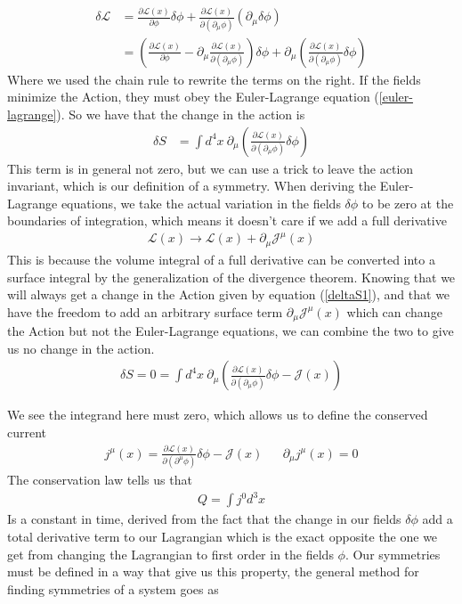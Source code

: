 \begin{align}
    \delta\mathcal{L} &= \frac{\partial\mathcal{L}(x)}{\partial\phi}\delta\phi + \frac{\partial\mathcal{L}(x)}{\partial(\partial_\mu\phi)}(\partial_\mu\delta\phi) \\
    &= \left(\frac{\partial\mathcal{L}(x)}{\partial\phi}- \partial_\mu\frac{\partial\mathcal{L}(x)}{\partial(\partial_\mu\phi)}\right)\delta\phi + \partial_\mu\left(\frac{\partial\mathcal{L}(x)}{\partial(\partial_\mu\phi)}\delta\phi\right)
\end{align}
Where we used the chain rule to rewrite the terms on the right. If the fields minimize the Action, they must obey the Euler-Lagrange equation (\ref{euler-lagrange}). So we have that the change in the action is 
\begin{align}\label{deltaS1}
    \delta S  &= \int d^4x~\partial_\mu\left(\frac{\partial\mathcal{L}(x)}{\partial(\partial_\mu\phi)}\delta\phi\right) 
\end{align}
This term is in general not zero, but we can use a trick to leave the action invariant, which is our definition of a symmetry. When deriving the Euler-Lagrange equations, we take the actual variation in the fields $\delta\phi$ to be zero at the boundaries of integration, which means it doesn't care if we add a full derivative\cite{peskin}
\begin{align}
\mathcal{L}(x)\rightarrow\mathcal{L}(x) + \partial_\mu\mathcal{J}^\mu(x)
\end{align}
This is because the volume integral of a full derivative can be converted into a surface integral by the generalization of the divergence theorem. 
Knowing that we will always get a change in the Action given by equation (\ref{deltaS1}), and that we have the freedom to add an arbitrary surface term $\partial_\mu\mathcal{J}^\mu(x)$ which can change the Action but not the Euler-Lagrange equations, we can combine the two to give us no change in the action. 
\begin{align}
\delta S = 0 = \int d^4x~\partial_\mu\left(\frac{\partial\mathcal{L}(x)}{\partial(\partial_\mu\phi)}\delta\phi-\mathcal{J}(x)\right) 
\end{align}

We see the integrand here must zero, which allows us to define the conserved current
\begin{align}\label{noether}
j^\mu(x) = \frac{\partial\mathcal{L}(x)}{\partial(\partial^\mu\phi)}\delta\phi-\mathcal{J}(x) &&\partial_\mu j^\mu(x) = 0
\end{align}
The conservation law tells us that 
\begin{align}
Q = \int j^0 d^3x
\end{align}
Is a constant in time, derived from the fact that the change in our fields $\delta\phi$ add a total derivative term to our Lagrangian which is the exact opposite the one we get from changing the Lagrangian to first order in the fields $\phi$. Our symmetries must be defined in a way that give us this property, the general method for finding symmetries of a system goes as 

